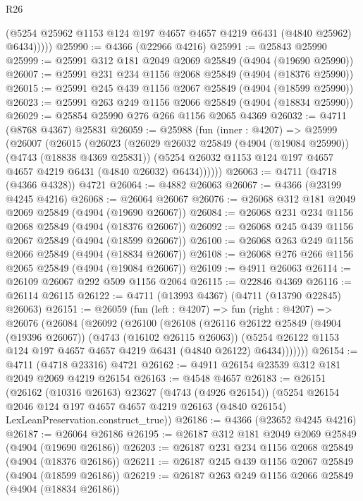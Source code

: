 \begin{lexlean}{R26}
\begin{coremodule}
            (@5254 @25962 @1153 @124 @197 @4657 @4657 @4219 @6431 (@4840 @25962) @6434)))))
@25990 := @4366 (@22966 @4216)
@25991 := @25843 @25990
@25999 := @25991 @312 @181 @2049 @2069 @25849 (@4904 (@19690 @25990))
@26007 := @25991 @231 @234 @1156 @2068 @25849 (@4904 (@18376 @25990))
@26015 := @25991 @245 @439 @1156 @2067 @25849 (@4904 (@18599 @25990))
@26023 := @25991 @263 @249 @1156 @2066 @25849 (@4904 (@18834 @25990))
@26029 := @25854 @25990 @276 @266 @1156 @2065 @4369
@26032 := @4711 (@8768 @4367) @25831
@26059 := @25988
    (fun (inner : @4207) =>
    @25999
      (@26007
        (@26015
          (@26023
            (@26029
              @26032
              @25849
              (@4904 (@19084 @25990))
              (@4743 (@18838 @4369 @25831))
              (@5254 @26032 @1153 @124 @197 @4657 @4657 @4219 @6431 (@4840 @26032) @6434))))))
@26063 := @4711 (@4718 (@4366 @4328)) @4721
@26064 := @4882 @26063
@26067 := @4366 (@23199 @4245 @4216)
@26068 := @26064 @26067
@26076 := @26068 @312 @181 @2049 @2069 @25849 (@4904 (@19690 @26067))
@26084 := @26068 @231 @234 @1156 @2068 @25849 (@4904 (@18376 @26067))
@26092 := @26068 @245 @439 @1156 @2067 @25849 (@4904 (@18599 @26067))
@26100 := @26068 @263 @249 @1156 @2066 @25849 (@4904 (@18834 @26067))
@26108 := @26068 @276 @266 @1156 @2065 @25849 (@4904 (@19084 @26067))
@26109 := @4911 @26063
@26114 := @26109 @26067 @292 @509 @1156 @2064
@26115 := @22846 @4369
@26116 := @26114 @26115
@26122 := @4711 (@13993 @4367) (@4711 (@13790 @22845) @26063)
@26151 := @26059
    (fun (left : @4207) =>
    fun (right : @4207) =>
    @26076
      (@26084
        (@26092
          (@26100
            (@26108
              (@26116
                @26122
                @25849
                (@4904 (@19396 @26067))
                (@4743 (@16102 @26115 @26063))
                (@5254 @26122 @1153 @124 @197 @4657 @4657 @4219 @6431 (@4840 @26122) @6434)))))))
@26154 := @4711 (@4718 @23316) @4721
@26162 := @4911 @26154 @23539 @312 @181 @2049 @2069 @4219 @26154
@26163 := @4548 @4657
@26183 := @26151
    (@26162
      (@10316 @26163)
      @23627
      (@4743 (@4926 @26154))
      (@5254
        @26154
        @2046
        @124
        @197
        @4657
        @4657
        @4219
        @26163
        (@4840 @26154)
        LexLeanPreservation.construct_true))
@26186 := @4366 (@23652 @4245 @4216)
@26187 := @26064 @26186
@26195 := @26187 @312 @181 @2049 @2069 @25849 (@4904 (@19690 @26186))
@26203 := @26187 @231 @234 @1156 @2068 @25849 (@4904 (@18376 @26186))
@26211 := @26187 @245 @439 @1156 @2067 @25849 (@4904 (@18599 @26186))
@26219 := @26187 @263 @249 @1156 @2066 @25849 (@4904 (@18834 @26186))

\end{coremodule}
\end{lexlean}
